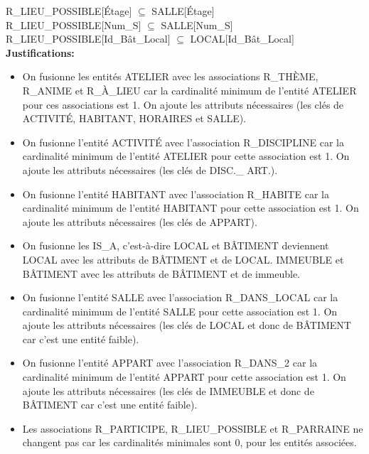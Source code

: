 \documentclass[a4paper,10.5pt]{report}
\begin{document}
	R\_LIEU\_POSSIBLE[Étage] $\subseteq$ SALLE[Étage] \\

	R\_LIEU\_POSSIBLE[Num\_S] $\subseteq$ SALLE[Num\_S] \\

	R\_LIEU\_POSSIBLE[Id\_Bât\_Local] $\subseteq$ LOCAL[Id\_Bât\_Local] \\

	\textbf{Justifications: }
	\begin{itemize}
		\item On fusionne les entités ATELIER avec les associations R\_THÈME, R\_ANIME et R\_À\_LIEU car la cardinalité minimum de l'entité ATELIER pour ces associations est 1. On ajoute les attributs nécessaires (les clés de ACTIVITÉ, HABITANT, HORAIRES et SALLE).
		\item On fusionne l'entité ACTIVITÉ avec l'association R\_DISCIPLINE car la cardinalité minimum de l'entité ATELIER pour cette association est 1. On ajoute les attributs nécessaires (les clés de DISC.\_ ART.).
		\item On fusionne l'entité HABITANT avec l'association R\_HABITE car la cardinalité minimum de l'entité HABITANT pour cette association est 1. On ajoute les attributs nécessaires (les clés de APPART).
		\item On fusionne les IS\_A, c'est-à-dire LOCAL et BÂTIMENT deviennent LOCAL avec les attributs de BÂTIMENT et de LOCAL\@. IMMEUBLE et BÂTIMENT avec les attributs de BÂTIMENT et de immeuble.	

		\item On fusionne l'entité SALLE avec l'association R\_DANS\_LOCAL car la cardinalité minimum de l'entité SALLE pour cette association est 1. On ajoute les attributs nécessaires (les clés de LOCAL et donc de BÂTIMENT car c'est une entité faible). 
		\item On fusionne l'entité APPART avec l'association R\_DANS\_2 car la cardinalité minimum de l'entité APPART pour cette association est 1. On ajoute les attributs nécessaires (les clés de IMMEUBLE et donc de BÂTIMENT car c'est une entité faible).
		\item Les associations R\_PARTICIPE, R\_LIEU\_POSSIBLE et R\_PARRAINE ne changent pas car les cardinalités minimales sont 0, pour les entités associées.

	\end{itemize}
	
	\newpage
\end{document}

